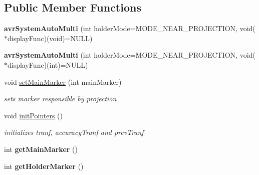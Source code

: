 \subsection*{Public Member Functions}
\begin{DoxyCompactItemize}
\item 
\hypertarget{classavr_system_auto_multi_afa47f7680288a953c3b5b7d498efcc1e}{{\bfseries avr\-System\-Auto\-Multi} (int holder\-Mode=M\-O\-D\-E\-\_\-\-N\-E\-A\-R\-\_\-\-P\-R\-O\-J\-E\-C\-T\-I\-O\-N, void($\ast$display\-Func)(void)=N\-U\-L\-L)}\label{classavr_system_auto_multi_afa47f7680288a953c3b5b7d498efcc1e}

\item 
\hypertarget{classavr_system_auto_multi_a256dadb3e285a837032df13c1d28b972}{{\bfseries avr\-System\-Auto\-Multi} (int holder\-Mode=M\-O\-D\-E\-\_\-\-N\-E\-A\-R\-\_\-\-P\-R\-O\-J\-E\-C\-T\-I\-O\-N, void($\ast$display\-Func)(int)=N\-U\-L\-L)}\label{classavr_system_auto_multi_a256dadb3e285a837032df13c1d28b972}

\item 
\hypertarget{classavr_system_auto_multi_a99b5740990d70eb05961ee83a54f58f1}{void \hyperlink{classavr_system_auto_multi_a99b5740990d70eb05961ee83a54f58f1}{set\-Main\-Marker} (int main\-Marker)}\label{classavr_system_auto_multi_a99b5740990d70eb05961ee83a54f58f1}

\begin{DoxyCompactList}\small\item\em sets marker responsible by projection \end{DoxyCompactList}\item 
\hypertarget{classavr_system_auto_multi_a723717d68b81968cfe8d654f096383af}{void \hyperlink{classavr_system_auto_multi_a723717d68b81968cfe8d654f096383af}{init\-Pointers} ()}\label{classavr_system_auto_multi_a723717d68b81968cfe8d654f096383af}

\begin{DoxyCompactList}\small\item\em initializes tranf, accuracy\-Tranf and prev\-Tranf \end{DoxyCompactList}\item 
\hypertarget{classavr_system_auto_multi_a5505ab405750f53d912b5bb529aebe07}{int {\bfseries get\-Main\-Marker} ()}\label{classavr_system_auto_multi_a5505ab405750f53d912b5bb529aebe07}

\item 
\hypertarget{classavr_system_auto_multi_a026bfb4ca356b64cf9415a6035335251}{int {\bfseries get\-Holder\-Marker} ()}\label{classavr_system_auto_multi_a026bfb4ca356b64cf9415a6035335251}


\end{DoxyCompactItemize}
